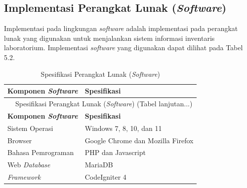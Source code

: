 \subsection{Implementasi Perangkat Lunak (\textit{Software})}
Implementasi pada lingkungan \textit{software} adalah implementasi pada perangkat lunak yang digunakan untuk menjalankan sistem informasi inventaris laboratorium. Implementasi \textit{software} yang digunakan dapat dilihat pada Tabel 5.2.

\begin{longtable}{l l}
	\caption{Spesifikasi Perangkat Lunak (\textit{Software})}                                                                                 \\
	\hline
	\textbf{\fontsize{11pt}{13pt}\selectfont Komponen \textit{Software}} & \textbf{\fontsize{11pt}{13pt}\selectfont Spesifikasi}              \\
	\hline
	\endfirsthead

	\multicolumn{2}{c}{\tablename\ \thetable\ {Spesifikasi Perangkat Lunak (\textit{Software})} \space (Tabel lanjutan...)}                   \\
	\hline
	\textbf{\fontsize{11pt}{13pt}\selectfont Komponen \textit{Software}} & \textbf{\fontsize{11pt}{13pt}\selectfont Spesifikasi}              \\
	\hline
	\endhead

	\fontsize{11pt}{13pt}\selectfont Sistem Operasi                      & \fontsize{11pt}{13pt}\selectfont Windows 7, 8, 10, dan 11          \\
	\fontsize{11pt}{13pt}\selectfont Browser                             & \fontsize{11pt}{13pt}\selectfont Google Chrome dan Mozilla Firefox \\
	\fontsize{11pt}{13pt}\selectfont Bahasa Pemrograman                  & \fontsize{11pt}{13pt}\selectfont PHP dan Javascript                \\
	\fontsize{11pt}{13pt}\selectfont Web \textit{Database}               & \fontsize{11pt}{13pt}\selectfont MariaDB                           \\
	\fontsize{11pt}{13pt}\selectfont \textit{Framework}                  & \fontsize{11pt}{13pt}\selectfont CodeIgniter 4                     \\
	\hline
\end{longtable}


